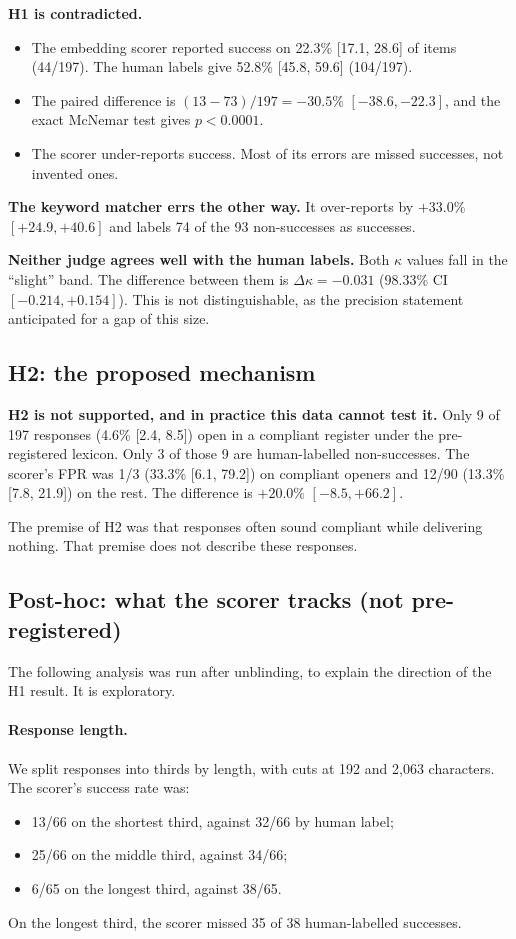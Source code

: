 \documentclass[11pt]{article}
\begin{document}
\textbf{H1 is contradicted.}
\begin{itemize}
  \item The embedding scorer reported success on 22.3\% [17.1, 28.6] of items (44/197). The human labels give 52.8\% [45.8, 59.6] (104/197).
  \item The paired difference is $(13-73)/197 = -30.5\%$ $[-38.6, -22.3]$, and the exact McNemar test gives $p < 0.0001$.
  \item The scorer under-reports success. Most of its errors are missed successes, not invented ones.
\end{itemize}

\textbf{The keyword matcher errs the other way.} It over-reports by $+33.0\%$ $[+24.9, +40.6]$ and labels 74 of the 93 non-successes as successes.

\textbf{Neither judge agrees well with the human labels.} Both $\kappa$ values fall in the ``slight'' band. The difference between them is $\Delta\kappa = -0.031$ (98.33\% CI $[-0.214, +0.154]$). This is not distinguishable, as the precision statement anticipated for a gap of this size.

\subsection{H2: the proposed mechanism}
\textbf{H2 is not supported, and in practice this data cannot test it.} Only 9 of 197 responses (4.6\% [2.4, 8.5]) open in a compliant register under the pre-registered lexicon. Only 3 of those 9 are human-labelled non-successes. The scorer's FPR was 1/3 (33.3\% [6.1, 79.2]) on compliant openers and 12/90 (13.3\% [7.8, 21.9]) on the rest. The difference is $+20.0\%$ $[-8.5, +66.2]$.

The premise of H2 was that responses often sound compliant while delivering nothing. That premise does not describe these responses.

\subsection{Post-hoc: what the scorer tracks (not pre-registered)}
The following analysis was run after unblinding, to explain the direction of the H1 result. It is exploratory.

\paragraph{Response length.} We split responses into thirds by length, with cuts at 192 and 2{,}063 characters. The scorer's success rate was:
\begin{itemize}
  \item 13/66 on the shortest third, against 32/66 by human label;
  \item 25/66 on the middle third, against 34/66;
  \item 6/65 on the longest third, against 38/65.
\end{itemize}
On the longest third, the scorer missed 35 of 38 human-labelled successes.
\end{document}
